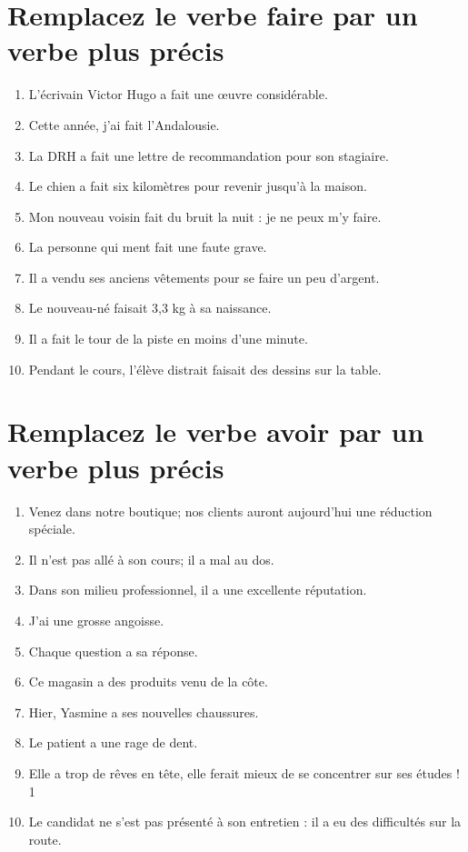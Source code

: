 \documentclass[12pt]{article}
\begin{document}
\section{Remplacez le verbe faire par un verbe plus précis} 
\begin{enumerate}
	\item L’écrivain Victor Hugo a fait une œuvre considérable. \item Cette année, j’ai fait l’Andalousie. \item La DRH a fait une lettre de recommandation pour son stagiaire. \item Le chien a fait six kilomètres pour revenir jusqu’à la maison. \item Mon nouveau voisin fait du bruit la nuit : je ne peux m’y faire. \item La personne qui ment fait une faute grave. \item Il a vendu ses anciens vêtements pour se faire un peu d’argent. \item Le nouveau-né faisait 3,3 kg à sa naissance. \item Il a fait le tour de la piste en moins d’une minute. \item Pendant le cours, l’élève distrait faisait des dessins sur la table.
\end{enumerate}

\section{Remplacez le verbe avoir par un verbe plus précis}
\begin{enumerate}
	\item Venez dans notre boutique; nos clients auront aujourd’hui une réduction spéciale. \item Il n’est pas allé à son cours; il a mal au dos. \item Dans son milieu professionnel, il a une excellente réputation. \item J’ai une grosse angoisse. \item Chaque question a sa réponse. \item Ce magasin a des produits venu de la côte. \item Hier, Yasmine a ses nouvelles chaussures. \item Le patient a une rage de dent. \item Elle a trop de rêves en tête, elle ferait mieux de se concentrer sur ses études ! 1\item Le candidat ne s’est pas présenté à son entretien : il a eu des difficultés sur la route.
\end{enumerate}
\end{document}

